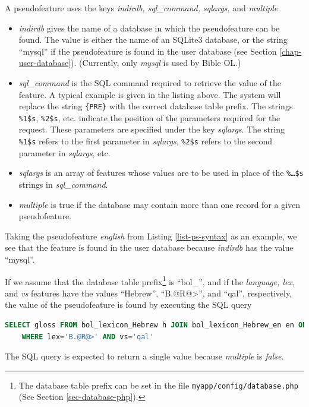 \documentclass[11pt,oneside,a4paper]{memoir}
\begin{document}
A pseudofeature uses the keys \emph{indirdb, sql\_command, sqlargs,} and \emph{multiple.}

\begin{itemize}
\item \emph{indirdb} gives the name of a database in which the pseudofeature can be found. The value
  is either the name of an SQLite3 database, or the string ``mysql'' if the
  pseudofeature is found in the user database (see Section
  \ref{chap-user-database}). (Currently, only \emph{mysql} is used by Bible OL.)
\item \emph{sql\_command} is the SQL command required to retrieve the value of the feature. A
  typical example is given in the listing above. The system will replace the string
  \texttt{\{PRE\}} with the correct database table prefix. The strings \texttt{\%1\$s}, \texttt{\%2\$s}, etc.
  indicate the position of the parameters required for the request. These parameters are specified
  under the key \emph{sqlargs}. The string \texttt{\%1\$s} refers to the first parameter in
  \emph{sqlargs}, \texttt{\%2\$s} refers to the second parameter in \emph{sqlargs}, etc.
\item \emph{sqlargs} is an array of features whose values are to be used in place of the
  \texttt{\%\ldots\$s} strings in \emph{sql\_command}.
\item \emph{multiple} is true if the database may contain more than one record for a given pseudofeature.
\end{itemize}

Taking the pseudofeature \emph{english} from Listing \ref{list-ps-syntax} as an example, we see that
the feature is found in the user database because \emph{indirdb} has the value ``mysql''.

If we assume that the database table prefix\footnote{The database table prefix can be set in the
  file \texttt{myapp/config/database.php} (See Section \ref{sec-database-php}).} is ``bol\_'', and
if the \emph{language, lex,} and \emph{vs} features have the values ``Hebrew'', ``B.@R@>'', and  ``qal'', respectively,
the value of the pseudofeature is found by executing the SQL query

\begin{lstlisting}[language=SQL]
SELECT gloss FROM bol_lexicon_Hebrew h JOIN bol_lexicon_Hebrew_en en ON en.lex_id=h.id
    WHERE lex='B.@R@>' AND vs='qal'
\end{lstlisting}


The SQL query is expected to return a single value because \emph{multiple} is \emph{false.}
\end{document}
